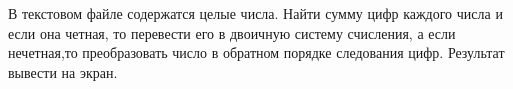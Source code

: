 В текстовом файле содержатся целые числа. Найти сумму цифр каждого числа и если она четная, то перевести его в двоичную систему счисления, а если нечетная,то преобразовать число в обратном порядке следования цифр. Результат вывести на экран. 